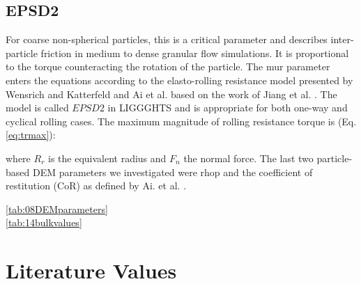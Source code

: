 \subsection{EPSD2}
\label{subsec:epsd2}

For coarse non-spherical particles, this is a critical parameter and describes
inter-particle friction in medium to dense granular flow simulations. It is proportional to the 
torque counteracting the rotation of the particle. The \acs{mur} parameter enters the 
equations according to the elasto-rolling resistance model presented by Wensrich and 
Katterfeld \cite{RefWorks:87} and Ai et al. \cite{RefWorks:131} 
based on the work of Jiang et al. \cite{RefWorks:143}. 
The model is called $EPSD2$ in \acs{LIGGGHTS} and is appropriate for both one-way and cyclical rolling cases.
The maximum magnitude of rolling resistance torque is (Eq. \ref{eq:trmax}):



where $R_r$ is the equivalent radius and $F_n$ the normal force.
The last two particle-based \acs{DEM} parameters we investigated were \acs{rhop}
and the coefficient of restitution (\acs{CoR}) as defined by Ai. et al.
\cite{RefWorks:131}.\\


\ref{tab:08DEMparameters}\\
\ref{tab:14bulkvalues}\\



\section{Literature Values}
\label{sec:literaturevalues}

